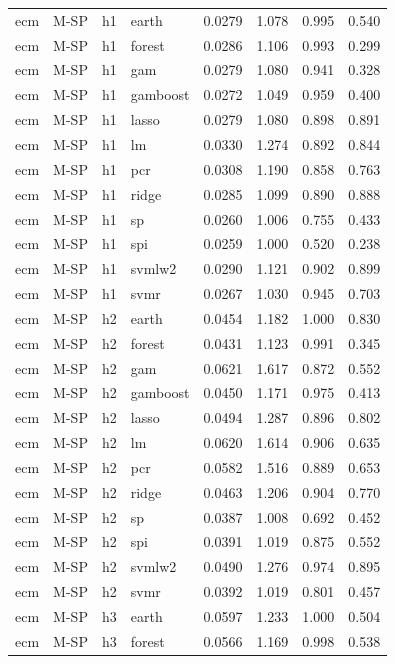 \begin{ThreePartTable}
\begin{longtable}[t]{llclcccc}
\addlinespace
ecm & M-SP & h1 & earth & 0.0279 & 1.078 & 0.995 & 0.540\\
ecm & M-SP & h1 & forest & 0.0286 & 1.106 & 0.993 & 0.299\\
ecm & M-SP & h1 & gam & 0.0279 & 1.080 & 0.941 & 0.328\\
ecm & M-SP & h1 & gamboost & 0.0272 & 1.049 & 0.959 & 0.400\\
ecm & M-SP & h1 & lasso & 0.0279 & 1.080 & 0.898 & 0.891\\
ecm & M-SP & h1 & lm & 0.0330 & 1.274 & 0.892 & 0.844\\
ecm & M-SP & h1 & pcr & 0.0308 & 1.190 & 0.858 & 0.763\\
ecm & M-SP & h1 & ridge & 0.0285 & 1.099 & 0.890 & 0.888\\
ecm & M-SP & h1 & sp & 0.0260 & 1.006 & 0.755 & 0.433\\
ecm & M-SP & h1 & spi & 0.0259 & 1.000 & 0.520 & 0.238\\
ecm & M-SP & h1 & svmlw2 & 0.0290 & 1.121 & 0.902 & 0.899\\
ecm & M-SP & h1 & svmr & 0.0267 & 1.030 & 0.945 & 0.703\\
\addlinespace
ecm & M-SP & h2 & earth & 0.0454 & 1.182 & 1.000 & 0.830\\
ecm & M-SP & h2 & forest & 0.0431 & 1.123 & 0.991 & 0.345\\
ecm & M-SP & h2 & gam & 0.0621 & 1.617 & 0.872 & 0.552\\
ecm & M-SP & h2 & gamboost & 0.0450 & 1.171 & 0.975 & 0.413\\
ecm & M-SP & h2 & lasso & 0.0494 & 1.287 & 0.896 & 0.802\\
ecm & M-SP & h2 & lm & 0.0620 & 1.614 & 0.906 & 0.635\\
ecm & M-SP & h2 & pcr & 0.0582 & 1.516 & 0.889 & 0.653\\
ecm & M-SP & h2 & ridge & 0.0463 & 1.206 & 0.904 & 0.770\\
ecm & M-SP & h2 & sp & 0.0387 & 1.008 & 0.692 & 0.452\\
ecm & M-SP & h2 & spi & 0.0391 & 1.019 & 0.875 & 0.552\\
ecm & M-SP & h2 & svmlw2 & 0.0490 & 1.276 & 0.974 & 0.895\\
ecm & M-SP & h2 & svmr & 0.0392 & 1.019 & 0.801 & 0.457\\
\addlinespace
ecm & M-SP & h3 & earth & 0.0597 & 1.233 & 1.000 & 0.504\\
ecm & M-SP & h3 & forest & 0.0566 & 1.169 & 0.998 & 0.538\\

\end{longtable}
\end{ThreePartTable}
